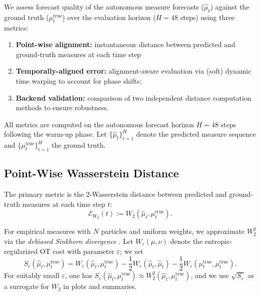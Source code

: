\documentclass[11pt]{article}
\newcommand{\1}{\mathbf{1}}
\begin{document}
We assess forecast quality of the autonomous measure forecasts ($\widehat{\mu}_t$) against the ground truth ($\mu_t^{\text{true}}$) over the evaluation horizon ($H=48$ steps) using three metrics:
\begin{enumerate}
\item \textbf{Point-wise alignment:} instantaneous distance between predicted and ground-truth measures at each time step

\item \textbf{Temporally-aligned error:} alignment-aware evaluation via (soft) dynamic time warping to account for phase shifts;

\item \textbf{Backend validation:} comparison of two independent distance computation methods to ensure robustness.
\end{enumerate}

All metrics are computed on the autonomous forecast horizon $H = 48$ steps following the warm-up phase. Let $\{\widehat{\mu}_t\}_{t=1}^H$ denote the predicted measure sequence and $\{\mu_t^{\text{true}}\}_{t=1}^H$ the ground truth.

\subsection{Point-Wise Wasserstein Distance}\label{sec:metric-w2}

The primary metric is the 2-Wasserstein distance between predicted and ground-truth measures at each time step $t$:
\begin{equation}\label{eq:w2-diag}
\mathcal{E}_{W_2}(t) := W_2(\widehat{\mu}_t, \mu_t^{\text{true}}).
\end{equation}

For empirical measures with $N$ particles and uniform weights, we approximate $W_2^2$ via the \emph{debiased Sinkhorn divergence} \cite{feydy2019interpolating}. Let $W_\varepsilon(\mu, \nu)$ denote the entropic-regularized OT cost with parameter $\varepsilon$; we set
\begin{equation}\label{eq:sinkhorn-debiased}
S_\varepsilon(\widehat{\mu}_t, \mu_t^{\text{true}}) 
= W_\varepsilon(\widehat{\mu}_t, \mu_t^{\text{true}})
- \frac{1}{2}W_\varepsilon(\widehat{\mu}_t, \widehat{\mu}_t)
- \frac{1}{2}W_\varepsilon(\mu_t^{\text{true}}, \mu_t^{\text{true}}).
\end{equation}
For suitably small $\varepsilon$, one has $S_\varepsilon(\widehat{\mu}_t, \mu_t^{\text{true}}) \approx W_2^2(\widehat{\mu}_t, \mu_t^{\text{true}})$, and we use $\sqrt{S_\varepsilon}$ as a surrogate for $W_2$ in plots and summaries.
\end{document}

